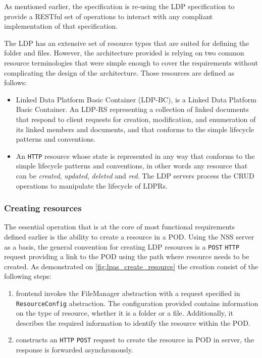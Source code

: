 As mentioned earlier, the \solid{} specification is re-using the LDP specification to provide a RESTful set of operations to interact with any compliant implementation of that specification. 

The LDP has an extensive set of resource types that are suited for defining the folder and files. However, the architecture provided is relying on two common resource terminologies that were simple enough to cover the requirements without complicating the design of the architecture. Those resources are defined as follows:

\begin{itemize}
     \item Linked Data Platform Basic Container (LDP-BC), is a Linked Data Platform Basic Container. An LDP-RS representing a collection of linked documents that respond to client requests for creation, modification, and enumeration of its linked members and documents, and that conforms to the simple lifecycle patterns and conventions.
    \item An \texttt{HTTP} resource whose state is represented in any way that conforms to the simple lifecycle patterns and conventions, in other words any resource that can be \textit{created}, \textit{updated}, \textit{deleted} and \textit{red}. The LDP servers process the CRUD operations to manipulate the lifecycle of LDPRs.
\end{itemize}


\subsubsection{Creating resources}

The essential operation that is at the core of most functional requirements defined earlier is the ability to create a resource in a POD. Using the NSS server as a basis, the general convention for creating LDP resources is a \texttt{POST} \texttt{HTTP} request providing a link to the POD using the path where resource needs to be created. As demonstrated on \autoref{fig:lpas_create_resource} the creation consist of the following steps:
\begin{enumerate}
    \item \lpa{} frontend invokes the FileManager abstraction with a request specified in \texttt{ResourceConfig} abstraction. The configuration provided contains information on the type of resource, whether it is a folder or a file. Additionally, it describes the required information to identify the resource within the POD.
    \item \lpas{} constructs an \texttt{HTTP} \texttt{POST} request to create the resource in POD in \solid{} server, the response is forwarded asynchronously.
\end{enumerate}

